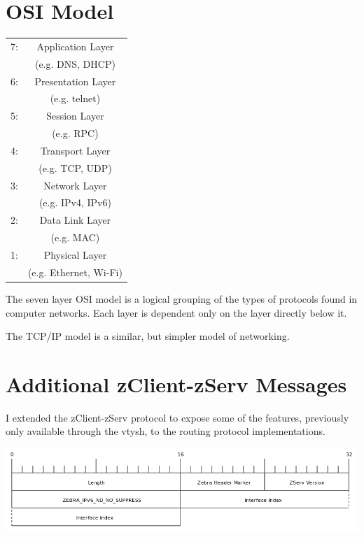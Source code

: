 \appendix 
\chapter{OSI Model}
\label{osi}
  \begin{center}
  \begin{tabular}{|lc|}
  \hline
  7: &
  Application Layer \\
  & (e.g. DNS, DHCP) \\
  \hline
  6: &
  Presentation Layer \\
  & (e.g. telnet) \\ 
  \hline
  5: &
  Session Layer \\
  & (e.g. RPC) \\
  \hline
  4: &
  Transport Layer \\
  & (e.g. TCP, UDP) \\
  \hline
  3: &
  Network Layer \\
  & (e.g. IPv4, IPv6) \\
  \hline  
  2: &
  Data Link Layer \\
  & (e.g. MAC) \\ 
  \hline  
  1: &
  Physical Layer \\
  & (e.g. Ethernet, Wi-Fi) \\
  \hline
\end{tabular}
\end{center}

The seven layer OSI model is a logical grouping of the types of protocols found
in computer networks. Each layer is dependent only on the layer directly below
it. 

The TCP/IP model is a similar, but simpler model of networking.

\chapter{Additional zClient-zServ Messages}
I extended the zClient-zServ protocol to expose some of the features,
previously only available through the vtysh, to the routing protocol
implementations. 

\begin{center}
	\includegraphics[width=0.9\linewidth]{../Diagrams/Packets/nd_no_suppress.png}
\end{center}

